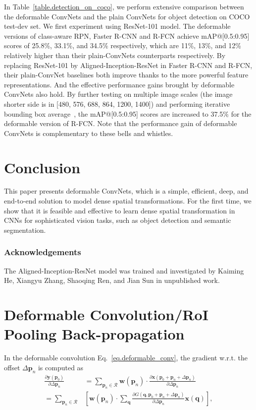 \documentclass[10pt,twocolumn,letterpaper]{article}
\begin{document}
In Table~\ref{table.detection_on_coco}, we perform extensive comparison between the deformable ConvNets and the plain ConvNets for object detection on COCO test-dev set. We first experiment using ResNet-101 model.  The deformable versions of class-aware RPN, Faster R-CNN and R-FCN achieve mAP@[0.5:0.95] scores of 25.8\%, 33.1\%, and 34.5\% respectively, which are 11\%, 13\%, and 12\% relatively higher than their plain-ConvNets counterparts respectively. By replacing ResNet-101 by Aligned-Inception-ResNet in Faster R-CNN and R-FCN, their plain-ConvNet baselines both improve  thanks to the more powerful feature representations. And the effective performance gains brought by deformable ConvNets also hold. By further testing on multiple image scales (the image shorter side is in [480, 576, 688, 864, 1200, 1400]) and performing iterative bounding box average~\cite{gidaris2015object}, the mAP@[0.5:0.95] scores are increased to 37.5\% for the deformable version of R-FCN. Note that the performance gain of deformable ConvNets is complementary to these bells and whistles. 

\section{Conclusion}

This paper presents deformable ConvNets, which is a simple, efficient, deep, and end-to-end solution to model dense spatial transformations. For the first time, we show that it is feasible and effective to learn dense spatial transformation in CNNs for sophisticated vision tasks, such as object detection and semantic segmentation.

\subsubsection*{Acknowledgements}
The Aligned-Inception-ResNet model was trained and investigated by Kaiming He, Xiangyu Zhang, Shaoqing Ren, and Jian Sun in unpublished work.

\appendix

\section{Deformable Convolution/RoI Pooling Back-propagation}
\label{sec:deformable_conv_backward}


In the deformable convolution Eq.~\eqref{eq.deformable_conv}, the gradient w.r.t. the offset $\Delta \mathbf{p}_n$ is computed as
\begin{equation}
\begin{split}
\frac{\partial \mathbf{y}(\mathbf{p}_0)}{\partial \Delta \mathbf{p}_n} & = \sum_{\mathbf{p}_n\in\mathcal{R}}\mathbf{w}(\mathbf{p}_n)\cdot \frac{\partial \mathbf{x}(\mathbf{p}_0+\mathbf{p}_n+\Delta \mathbf{p}_n)}{\partial \Delta \mathbf{p}_n} \\
= \sum_{\mathbf{p}_n\in\mathcal{R}} & \left[\mathbf{w}(\mathbf{p}_n)\cdot \sum_\mathbf{q}  \frac{\partial  G(\mathbf{q}, \mathbf{p}_0+\mathbf{p}_n+\Delta \mathbf{p}_n)}{\partial \Delta \mathbf{p}_n} \mathbf{x}(\mathbf{q})\right], \\
\end{split}
\end{equation}
\end{document}
